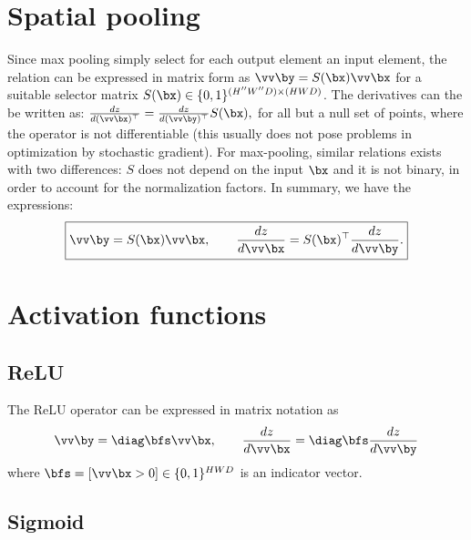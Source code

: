 \section{Spatial pooling}\label{s:impl-pooling}

Since max pooling simply select for each output element an input element, the relation can be expressed in matrix form as
$
    \vv\by = S(\bx) \vv \bx
$
for a suitable selector matrix $S(\bx)\in\{0,1\}^{(H''W''D) \times (HWD)}$. The derivatives can the be written as:
$
\frac{d z}{d (\vv \bx)^\top}
=
\frac{d z}{d (\vv \by)^\top}
S(\bx),
$
for all but a null set of points, where the operator is not differentiable (this usually does not pose problems in optimization by stochastic gradient). For max-pooling, similar relations exists with two differences: $S$ does not depend on the input $\bx$ and it is not binary, in order to account for the normalization factors. In summary, we have the expressions:
\begin{equation}\label{e:max-mat}
\boxed{
\vv\by = S(\bx) \vv \bx,
\qquad
\frac{d z}{d \vv \bx}
=
S(\bx)^\top
\frac{d z}{d \vv \by}.
}
\end{equation}



\section{Activation functions}\label{s:impl-activation}

\subsection{ReLU}\label{s:impl-relu}

The ReLU operator can be expressed in matrix notation as
\[
\vv\by = \diag\bfs \vv \bx,
\qquad
\frac{d z}{d \vv \bx}
=
\diag\bfs
\frac{d z}{d \vv \by}
\]
where $\bfs = [\vv \bx > 0] \in\{0,1\}^{HWD}$ is an indicator vector.

\subsection{Sigmoid}\label{s:impl-sigmoid}

